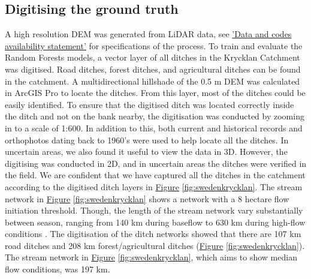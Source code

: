 \documentclass[]{interact}
\theoremstyle{plain}%
\theoremstyle{definition}
\theoremstyle{remark}
\begin{document}
\subsection{Digitising the ground truth}
A high resolution DEM was generated from LiDAR data, see \hyperref[lidartodem]{'Data and codes availability statement'} for specifications of the process. To train and evaluate the Random Forests models, a vector layer of all ditches in the Krycklan Catchment \citep{krycklancatchment} was digitised. Road ditches, forest ditches, and agricultural ditches can be found in the catchment. A multidirectional hillshade of the 0.5 m DEM was calculated in ArcGIS Pro to locate the ditches. From this layer, most of the ditches could be easily identified. To ensure that the digitised ditch was located correctly inside the ditch and not on the bank nearby, the digitisation was conducted by zooming in to a scale of 1:600. In addition to this, both current and historical records and orthophotos dating back to 1960’s were used to help locate all the ditches. In uncertain areas, we also found it useful to view the data in 3D. However, the digitising was conducted in 2D, and in uncertain areas the ditches were verified in the field. We are confident that we have captured all the ditches in the catchment according to the digitised  ditch layers in \hyperref[fig:swedenkrycklan]{Figure} \ref{fig:swedenkrycklan}. The stream network in \hyperref[fig:swedenkrycklan]{Figure} \ref{fig:swedenkrycklan} shows a network with a 8 hectare flow initiation threshold. Though, the length of the stream network vary substantially between season, ranging from 140 km during baseflow to 630 km during high-flow conditions \citep{mappingtemporal}. The digitisation of the ditch networks showed that there are 107 km road ditches and 208 km forest/agricultural ditches (\hyperref[fig:swedenkrycklan]{Figure} \ref{fig:swedenkrycklan}). The stream network in \hyperref[fig:swedenkrycklan]{Figure} \ref{fig:swedenkrycklan}, which aims to show median flow conditions, was 197 km.
\end{document}
